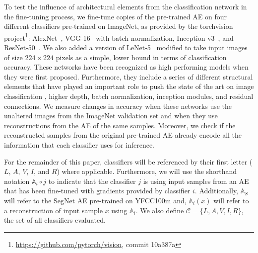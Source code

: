 \documentclass[10pt,twocolumn,a4paper]{article}
\newcommand{\autoe}[1]{\mathbb{A}_{#1}}
\newcommand{\clf}[1]{#1}
\newcommand{\nn}[2]{\autoe{#1}\circ\clf{#2}}
\begin{document}
To test the influence of architectural elements from the classification network in the fine-tuning process, we fine-tune copies of the pre-trained AE on four different classifiers pre-trained on ImageNet, as provided by the torchvision project\footnote{\url{https://github.com/pytorch/vision}, commit 10a387a}:
AlexNet~\cite{DBLP:journals/corr/Krizhevsky14},
VGG-16~\cite{Simonyan14c} with batch normalization,
Inception v3~\cite{DBLP:journals/corr/SzegedyVISW15},
and ResNet-50~\cite{DBLP:journals/corr/HeZRS15}.
We also added a version of LeNet-5~\cite{lecun1998gradient} modified to take input images of size $224\times 224$ pixels as a simple, lower bound in terms of classification accuracy.
These networks have been recognized as high performing models when they were first proposed.
Furthermore, they include a series of different structural elements that have played an important role to push the state of the art on image classification \eg, higher depth, batch normalization, inception modules, and residual connections.
We measure changes in accuracy when these networks use the unaltered images from the ImageNet validation set and when they use reconstructions from the AE of the same samples.
Moreover, we check if the reconstructed samples from the original pre-trained AE already encode all the information that each classifier uses for inference.

For the remainder of this paper, classifiers will be referenced by their first letter ($L$, $A$, $V$, $I$, and $R$) where applicable.
Furthermore, we will use the shorthand notation $\nn{i}{j}$ to indicate that the classifier $j$ is using input samples from an AE that has been fine-tuned with gradients provided by classifier $i$.
Additionally, $\autoe{S}$ will refer to the SegNet AE pre-trained on YFCC100m and, $\autoe{i}(x)$ will refer to a reconstruction of input sample $x$ using $\autoe{i}$.
We also define $\mathcal{C} = \{L,A,V,I,R\}$, the set of all classifiers evaluated.
\end{document}
